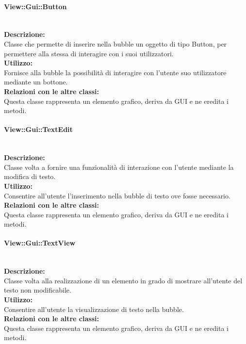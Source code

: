\paragraph{View\-::Gui\-::Button}\label{gui-button}\mbox{}\\
\textbf{Descrizione:}\\
Classe che permette di inserire nella bubble un oggetto di tipo Button, per permettere alla stessa di interagire con i suoi utilizzatori.\\
\textbf{Utilizzo:}\\
Fornisce alla bubble la possibilità di interagire con l'utente suo utilizzatore mediante un bottone.\\
\textbf{Relazioni con le altre classi:}\\
Questa classe rappresenta un elemento grafico, deriva da GUI e ne eredita i metodi.\\

\paragraph{View\-::Gui\-::Text\-Edit}\label{gui-tedit}\mbox{}\\
\textbf{Descrizione:}\\
Classe volta a fornire una funzionalità di interazione con l'utente mediante la modifica di testo.\\
\textbf{Utilizzo:}\\
Consentire all'utente l'inserimento nella bubble di testo ove fosse necessario.\\
\textbf{Relazioni con le altre classi:}\\
Questa classe rappresenta un elemento grafico, deriva da GUI e ne eredita i metodi.\\

\paragraph{View\-::Gui\-::Text\-View}\label{gui-tview}\mbox{}\\
\textbf{Descrizione:}\\
Classe volta alla realizzazione di un elemento in grado di mostrare all'utente del testo non modificabile.\\
\textbf{Utilizzo:}\\
Consentire all'utente la visualizzazione di testo nella bubble.\\
\textbf{Relazioni con le altre classi:}\\
Questa classe rappresenta un elemento grafico, deriva da GUI e ne eredita i metodi.\\

